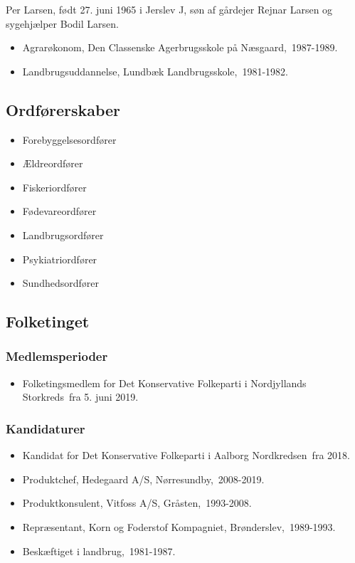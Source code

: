 \documentclass[11pt, a4paper]{awesome-cv}
\begin{document}
\makecvheader[R]
\makelettertitle
\begin{cvletter}
Per Larsen, født 27. juni 1965 i Jerslev J, søn af gårdejer Rejnar Larsen og sygehjælper Bodil Larsen.

\begin{itemize}
\item Agrarøkonom, Den Classenske Agerbrugsskole på Næsgaard, 1987-1989.
\item Landbrugsuddannelse, Lundbæk Landbrugsskole, 1981-1982.
\end{itemize}
\subsection*{Ordførerskaber}
\begin{itemize}
\item Forebyggelsesordfører
\item Ældreordfører
\item Fiskeriordfører
\item Fødevareordfører
\item Landbrugsordfører
\item Psykiatriordfører
\item Sundhedsordfører
\end{itemize}
\subsection*{Folketinget}
\subsubsection*{Medlemsperioder}
\begin{itemize}
\item Folketingsmedlem for Det Konservative Folkeparti i Nordjyllands Storkreds fra 5. juni 2019.
\end{itemize}
\subsubsection*{Kandidaturer}
\begin{itemize}
\item Kandidat for Det Konservative Folkeparti i Aalborg Nordkredsen fra 2018.
\end{itemize}
\begin{itemize}
\item Produktchef, Hedegaard A/S, Nørresundby, 2008-2019.
\item Produktkonsulent, Vitfoss A/S, Gråsten, 1993-2008.
\item Repræsentant, Korn og Foderstof Kompagniet, Brønderslev, 1989-1993.
\item Beskæftiget i landbrug, 1981-1987.
\end{itemize}
\end{cvletter}
\end{document}

